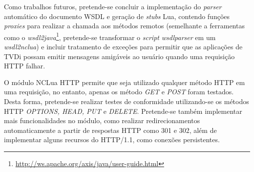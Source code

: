 Como trabalhos futuros, pretende-se concluir a implementação do \textit{parser} automático do 
documento WSDL e geração de \textit{stubs} Lua, contendo funções \textit{proxies} para realizar a chamada aos métodos remotos
(semelhante a ferramentas como o \textit{wsdl2java}\footnote{\url{http://ws.apache.org/axis/java/user-guide.html}}, 
pretende-se transformar o \textit{script} \textit{wsdlparser} em um \textit{wsdl2nclua})
e incluir tratamento de exceções para permitir que as aplicações
de TVDi possam emitir mensagens amigáveis ao usuário quando uma requisição HTTP falhar.

O módulo NCLua HTTP permite que seja utilizado qualquer método HTTP em uma requisição, no entanto,
apenas os método \textit{GET} e \textit{POST} foram testados. Desta forma, pretende-se realizar testes
de conformidade utilizando-se os métodos HTTP \textit{OPTIONS, HEAD, PUT} e \textit{DELETE}. Pretende-se também
implementar mais funcionalidades no módulo, como realizar redirecionamentos automaticamente
a partir de respostas HTTP como 301 e 302, além de implementar alguns recursos do HTTP/1.1, como
conexões persistentes.

